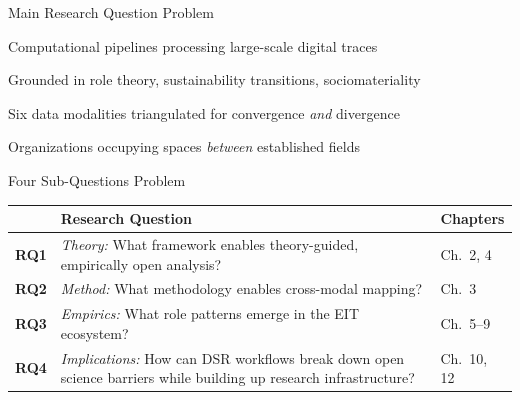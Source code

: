 \documentclass[aspectratio=169]{beamer}
\newcommand{\secmark}[1]{\hfill{\scriptsize\color{gray}#1}}
\begin{document}
\begin{frame}{Main Research Question}
\secmark{Problem}
\begin{center}
\end{center}
\vspace{0.5em}
\small
\begin{description}[leftmargin=2.5cm]
    \item[Data-driven] Computational pipelines processing large-scale digital traces
    \item[Theory-guided] Grounded in role theory, sustainability transitions, sociomateriality
    \item[Multimodal] Six data modalities triangulated for convergence \emph{and} divergence
    \item[Interstitial] Organizations occupying spaces \emph{between} established fields
\end{description}
\end{frame}

\begin{frame}{Four Sub-Questions}
\secmark{Problem}
\renewcommand{\arraystretch}{1.6}
\begin{tabularx}{\textwidth}{@{}l X l@{}}
\toprule
& \textbf{Research Question} & \textbf{Chapters} \\
\midrule
\textbf{RQ1} & \textit{Theory:} What framework enables theory-guided, empirically open analysis? & Ch.~2, 4 \\
\textbf{RQ2} & \textit{Method:} What methodology enables cross-modal mapping? & Ch.~3 \\
\textbf{RQ3} & \textit{Empirics:} What role patterns emerge in the EIT ecosystem? & Ch.~5--9 \\
\textbf{RQ4} & \textit{Implications:} How can DSR workflows break down open science barriers while building up research infrastructure? & Ch.~10, 12 \\
\bottomrule
\end{tabularx}
\end{frame}
\end{document}

